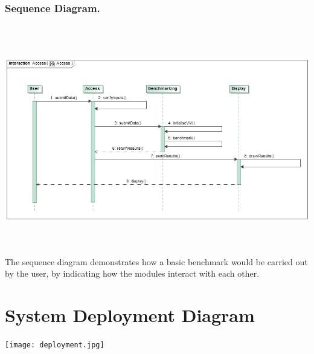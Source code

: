 \documentclass[runningheads,a4paper]{article}
\begin{document}
\subsubsection{\textbf{Sequence Diagram.}}
\includegraphics[width=15cm , height=10cm]{AccessSD.jpg}  \\
The sequence diagram demonstrates how a basic benchmark would be carried out by the user, by indicating how the modules interact with each other.

\section{System Deployment Diagram}
\texttt{[image: deployment.jpg]} \\
\end{document}
